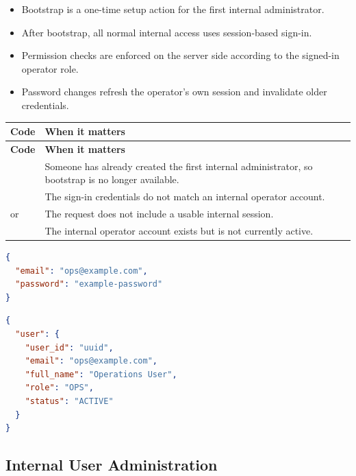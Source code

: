 \begin{itemize}
  \item Bootstrap is a one-time setup action for the first internal
  administrator.
  \item After bootstrap, all normal internal access uses session-based sign-in.
  \item Permission checks are enforced on the server side according to the
  signed-in operator role.
  \item Password changes refresh the operator's own session and invalidate older
  credentials.
\end{itemize}

\begin{longtable}{@{}L{0.31\textwidth}L{0.59\textwidth}@{}}
\toprule
\textbf{Code} & \textbf{When it matters} \\
\midrule
\endfirsthead
\toprule
\textbf{Code} & \textbf{When it matters} \\
\midrule
\endhead
{} & Someone has already created the first
internal administrator, so bootstrap is no longer available. \\
\bodyrowrule
{} & The sign-in credentials do not match
an internal operator account. \\
\bodyrowrule
{} or  & The
request does not include a usable internal session. \\
\bodyrowrule
{} & The internal operator account exists but is not
currently active. \\
\bottomrule
\end{longtable}

\begin{lstlisting}[language=json,caption={Internal operator login request example}]
{
  "email": "ops@example.com",
  "password": "example-password"
}
\end{lstlisting}

\begin{lstlisting}[language=json,caption={Internal operator login response example}]
{
  "user": {
    "user_id": "uuid",
    "email": "ops@example.com",
    "full_name": "Operations User",
    "role": "OPS",
    "status": "ACTIVE"
  }
}
\end{lstlisting}

\subsection{Internal User Administration}


